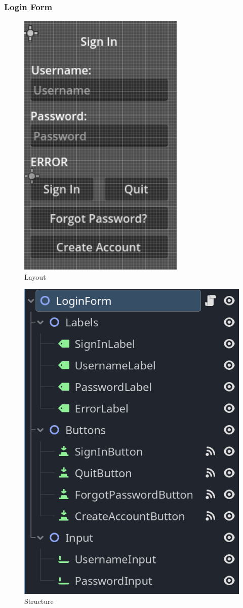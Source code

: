 \documentclass{article}
\begin{document}
        \subsubsection{Login Form}
        \begin{multicols}{2}
                \begin{figure}[H]
                        \centering
                        \includegraphics[width = 0.5\columnwidth]{images/development/LoginForm_layout.PNG}
                        \caption{Layout}
                \end{figure}
                \begin{figure}[H]
                        \centering
                        \includegraphics[width = 0.6\columnwidth]{images/development/LoginForm_structure.PNG}
                        \caption{Structure}
                \end{figure}
        \end{multicols}
\end{document}
